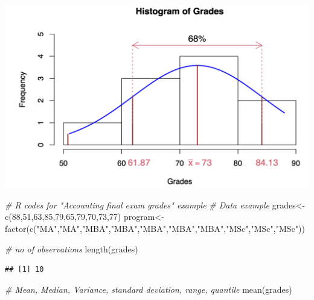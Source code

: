 \documentclass[
]{article}
\newcommand{\CommentTok}[1]{\textcolor[rgb]{0.56,0.35,0.01}{\textit{#1}}}
\newcommand{\DecValTok}[1]{\textcolor[rgb]{0.00,0.00,0.81}{#1}}
\newcommand{\FunctionTok}[1]{\textcolor[rgb]{0.00,0.00,0.00}{#1}}
\newcommand{\NormalTok}[1]{#1}
\newcommand{\OtherTok}[1]{\textcolor[rgb]{0.56,0.35,0.01}{#1}}
\newcommand{\StringTok}[1]{\textcolor[rgb]{0.31,0.60,0.02}{#1}}
\begin{document}
\begin{center}\includegraphics[width=1\linewidth,height=1\textheight]{Exempirical} \end{center}
 
\begin{Highlighting}[]
\CommentTok{\# R codes for "Accounting final exam grades" example}
\CommentTok{\# Data example}
\NormalTok{grades}\OtherTok{\textless{}{-}}\FunctionTok{c}\NormalTok{(}\DecValTok{88}\NormalTok{,}\DecValTok{51}\NormalTok{,}\DecValTok{63}\NormalTok{,}\DecValTok{85}\NormalTok{,}\DecValTok{79}\NormalTok{,}\DecValTok{65}\NormalTok{,}\DecValTok{79}\NormalTok{,}\DecValTok{70}\NormalTok{,}\DecValTok{73}\NormalTok{,}\DecValTok{77}\NormalTok{)}
\NormalTok{program}\OtherTok{\textless{}{-}}\FunctionTok{factor}\NormalTok{(}\FunctionTok{c}\NormalTok{(}\StringTok{"MA"}\NormalTok{,}\StringTok{"MA"}\NormalTok{,}\StringTok{"MBA"}\NormalTok{,}\StringTok{"MBA"}\NormalTok{,}\StringTok{"MBA"}\NormalTok{,}\StringTok{"MBA"}\NormalTok{,}\StringTok{"MBA"}\NormalTok{,}\StringTok{"MSc"}\NormalTok{,}\StringTok{"MSc"}\NormalTok{,}\StringTok{"MSc"}\NormalTok{))}

\CommentTok{\# no of observations    }
\FunctionTok{length}\NormalTok{(grades)}
\end{Highlighting}

\begin{verbatim}
## [1] 10
\end{verbatim}

\begin{Highlighting}[]
\CommentTok{\# Mean, Median, Variance, standard deviation, range, quantile}
\FunctionTok{mean}\NormalTok{(grades)}
\end{Highlighting}
\end{document}
